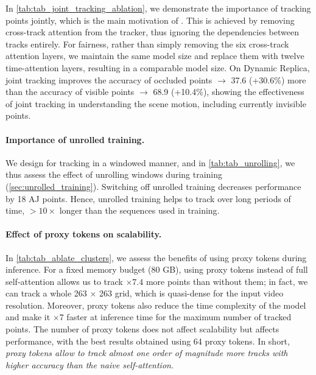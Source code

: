 In \cref{tab:tab_joint_tracking_ablation}, we demonstrate the importance of tracking points jointly, which is the main motivation of \method.
This is achieved by removing cross-track attention from the tracker, thus ignoring the dependencies between tracks entirely.
For fairness, rather than simply removing the six cross-track attention layers, we maintain the same model size and replace them with twelve time-attention layers, resulting in a comparable model size.
On Dynamic Replica, joint tracking improves the accuracy of occluded points  $\rightarrow$ 37.6 (+30.6\%) more than the accuracy of visible points  $\rightarrow$ 68.9 (+10.4\%), showing the effectiveness of joint tracking in understanding the scene motion, including currently invisible points.



\paragraph{Importance of unrolled training.}

We design \method for tracking in a windowed manner, and in \cref{tab:tab_unrolling}, we thus assess the effect of unrolling windows during training (\cref{sec:unrolled_training}).
Switching off unrolled training decreases performance by 18 AJ points.
Hence, unrolled training helps to track over long periods of time, $>10\times$ longer than the sequences used in training.

\paragraph{Effect of proxy tokens on scalability.}

In \cref{tab:tab_ablate_clusters}, we assess the benefits of using proxy tokens during inference.
For a fixed memory budget (80 GB), using proxy tokens instead of full self-attention allows us to track $\times 7.4$ more points than without them;
in fact, we can track a whole 263 $\times$ 263 grid, which is quasi-dense for the input video resolution.
Moreover, proxy tokens also reduce the time complexity of the model and make it $\times 7$ faster at inference time for the maximum number of tracked points.
The number of proxy tokens does not affect scalability but affects performance, with the best results obtained using 64 proxy tokens.
In short, \emph{proxy tokens allow to track almost one order of magnitude more tracks with higher accuracy than the naive self-attention}.

